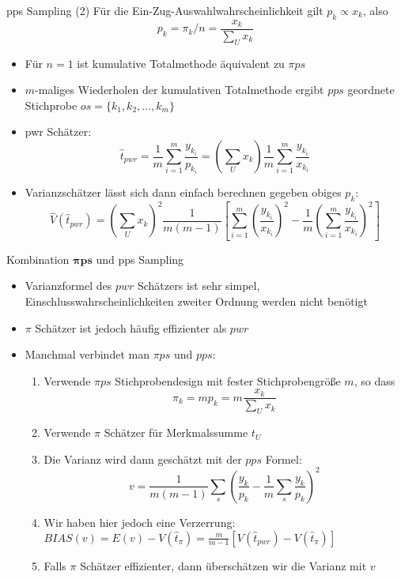 \documentclass[9pt]{beamer}
\begin{document}
\begin{frame}{pps Sampling (2)}
Für die Ein-Zug-Auswahlwahrscheinlichkeit gilt $p_k \propto x_k$, also $$p_k = \pi_k/n =  \frac{x_k}{\sum_U x_k}$$
\begin{itemize}
	\item Für $n=1$ ist kumulative Totalmethode äquivalent zu $\pi ps$
	\item $m$-maliges Wiederholen der kumulativen Totalmethode ergibt $pps$ geordnete Stichprobe $os =\{k_1,k_2,...,k_m\}$
	\item pwr Schätzer: $$\hat{t}_{pwr} = \frac{1}{m}\sum_{i=1}^{m}\frac{y_{k_i}}{p_{k_i}}=(\sum_U x_k)\frac{1}{m} \sum_{i=1}^m \frac{y_{k_i}}{x_{k_i}}$$
	\item Varianzschätzer lässt sich dann einfach berechnen gegeben obiges $p_k$:
	$$ \hat{V}(\hat{t}_{pwr}) = (\sum_U x_k)^2 \frac{1}{m(m-1)}\left[\sum_{i=1}^{m}\left(\frac{y_{k_i}}{x_{k_i}}\right)^2-\frac{1}{m}\left(\sum_{i=1}^{m} \frac{y_{k_i}}{x_{k_i}}\right)^2\right]$$
\end{itemize}
\end{frame}

\begin{frame}{Kombination $\boldsymbol{\pi ps}$ und pps Sampling}
\begin{itemize}
	\item Varianzformel des $pwr$ Schätzers ist sehr simpel, Einschlusswahrscheinlichkeiten zweiter Ordnung werden nicht benötigt
	\item $\pi$ Schätzer ist jedoch häufig effizienter als $pwr$
	\item Manchmal verbindet man $\pi ps$ und $pps$:
	\begin{enumerate}
		\item Verwende $\pi ps$ Stichprobendesign mit fester Stichprobengröße $m$, so dass $$\pi_k = m p_k = m \frac{x_k}{\sum_U x_k}$$
		\item Verwende $\pi$ Schätzer für Merkmalssumme $t_U$
		\item Die Varianz wird dann geschätzt mit der $pps$ Formel:
		$$v = \frac{1}{m(m-1)} \sum_s \left(\frac{y_k}{p_k}-\frac{1}{m}\sum_s \frac{y_k}{p_k}\right)^2$$
		\item Wir haben hier jedoch eine Verzerrung:
		$BIAS(v) = E(v)-V(\hat{t}_\pi)=\frac{m}{m-1}\left[V(\hat{t}_{pwr})-V(\hat{t}_\pi)\right]$
		\item Falls $\pi$ Schätzer effizienter, dann überschätzen wir die Varianz mit $v$		
	\end{enumerate}
\end{itemize}
\end{frame}
\end{document}
